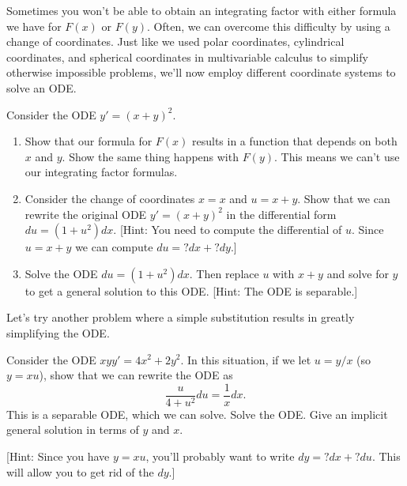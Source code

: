 Sometimes you won't be able to obtain an integrating factor with either formula we have for $F(x)$ or $F(y)$. 
Often, we can overcome this difficulty by using a change of coordinates. Just like we used polar coordinates, cylindrical coordinates, and spherical coordinates in multivariable calculus to simplify otherwise impossible problems, we'll now employ different coordinate systems to solve an ODE.

\begin{problem}
 Consider the ODE $y'=(x+y)^2$.  
\begin{enumerate}
 \item Show that our formula for $F(x)$ results in a function that depends on both $x$ and $y$. Show the same thing happens with $F(y)$.  This means we can't use our integrating factor formulas.
 \item Consider the change of coordinates $x=x$ and $u=x+y$. Show that we can rewrite the original ODE $y'=(x+y)^2$ in the differential form $du=(1+u^2)dx$. 
[Hint:  You need to compute the differential of $u$.  Since $u=x+y$ we can compute $du=?dx+?dy$.]
 \item 
{}%
Solve the ODE $du=(1+u^2)dx$.  Then replace $u$ with $x+y$ and solve for $y$ to get a general solution to this ODE. [Hint: The ODE is separable.]
\end{enumerate}
\end{problem}

Let's try another problem where a simple substitution results in greatly simplifying the ODE.
  

\begin{problem}
 Consider the ODE $xy y' = 4x^2+2y^2$.  
In this situation, if we let $u=y/x$ (so $y=xu$), show that we can rewrite the ODE as 
$$\frac{u}{4+u^2}du = \frac{1}{x}dx.$$  This is a separable ODE, which we can solve.  Solve the ODE. 
Give an implicit general solution in terms of $y$ and $x$. 

[Hint: Since you have $y=xu$, you'll probably want to write $dy = ?dx+?du$.  This will allow you to get rid of the $dy$.]
\end{problem}

